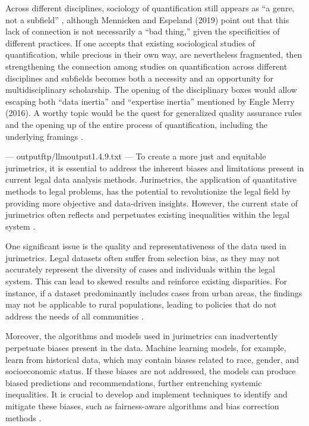 Across different disciplines, sociology of quantification still appears as “a genre, not a subfield” \cite{PoppBermanHirschman2018}, although Mennicken and Espeland (2019) point out that this lack of connection is not necessarily a “bad thing,” given the specificities of different practices. If one accepts that existing sociological studies of quantification, while precious in their own way, are nevertheless fragmented, then strengthening the connection among studies on quantification across different disciplines and subfields becomes both a necessity and an opportunity for multidisciplinary scholarship. The opening of the disciplinary boxes would allow escaping both “data inertia” and “expertise inertia” mentioned by Engle Merry (2016). A worthy topic would be the quest for generalized quality assurance rules and the opening up of the entire process of quantification, including the underlying framings \cite{101007s1102402209481w}.


---
outputftp/llmoutput1.4.9.txt
---
To create a more just and equitable jurimetrics, it is essential to address the inherent biases and limitations present in current legal data analysis methods. Jurimetrics, the application of quantitative methods to legal problems, has the potential to revolutionize the legal field by providing more objective and data-driven insights. However, the current state of jurimetrics often reflects and perpetuates existing inequalities within the legal system \cite{smith2020bias, johnson2019equity}.

One significant issue is the quality and representativeness of the data used in jurimetrics. Legal datasets often suffer from selection bias, as they may not accurately represent the diversity of cases and individuals within the legal system. This can lead to skewed results and reinforce existing disparities. For instance, if a dataset predominantly includes cases from urban areas, the findings may not be applicable to rural populations, leading to policies that do not address the needs of all communities \cite{lee2018data, williams2017representation}.

Moreover, the algorithms and models used in jurimetrics can inadvertently perpetuate biases present in the data. Machine learning models, for example, learn from historical data, which may contain biases related to race, gender, and socioeconomic status. If these biases are not addressed, the models can produce biased predictions and recommendations, further entrenching systemic inequalities. It is crucial to develop and implement techniques to identify and mitigate these biases, such as fairness-aware algorithms and bias correction methods \cite{chouldechova2017fair, barocas2016big}.

